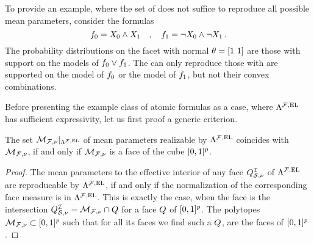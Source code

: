 \begin{example}
    \label{exa:insufficentHLNsetExpressivity}
    To provide an example, where the set of \HybridLogicNetworks{} does not suffice to reproduce all possible mean parameters, consider the formulas
    \[ f_{0} = X_{0} \land X_{1} \quad, \quad f_{1} = \lnot X_{0} \land \lnot X_{1} \, . \]
    The probability distributions on the facet with normal $\theta=[1\,\, 1]$ are those with support on the models of $f_{0}\lor f_{1}$.
    The \HybridLogicNetworks{} can only reproduce those with are supported on the model of $f_{0}$ or the model of $f_{1}$, but not their convex combinations.

\end{example}

Before presenting the example class of atomic formulas as a case, where $\Lambda^{\mathcal{F},\mathrm{EL}}$ has sufficient expressivity, let us first proof a generic criterion.


\begin{theorem}
    \label{the:sufficientHLNExpressivity}
    The set $\mathcal{M}_{\mathcal{F},\nu}|_{\Lambda^{\mathcal{F},\mathrm{EL}}}$ of mean parameters realizable by $\Lambda^{\mathcal{F},\mathrm{EL}}$ coincides with $\mathcal{M}_{\mathcal{F},\nu}$, if and only if $\mathcal{M}_{\mathcal{F},\nu}$ is a face of the cube $[0,1]^{p}$.
\end{theorem}
\begin{proof}
    The mean parameters to the effective interior of any face $Q^{\mathcal{I}}_{\mathcal{S},\nu}$ of $\Lambda^{\mathcal{F},\mathrm{EL}}$ are reproducable by $\Lambda^{\mathcal{F},\mathrm{EL}}$, if and only if the normalization of the corresponding face measure is in $\Lambda^{\mathcal{F},\mathrm{EL}}$.
    This is exactly the case, when the face is the intersection $Q^{\mathcal{I}}_{\mathcal{S},\nu}=\mathcal{M}_{\mathcal{F},\nu}\cap Q$ for a face $Q$ of $[0,1]^{p}$.
    The polytopes $\mathcal{M}_{\mathcal{F},\nu}\subset[0,1]^{p}$ such that for all its faces we find such a $Q$, are the faces of $[0,1]^{p}$.
\end{proof}

